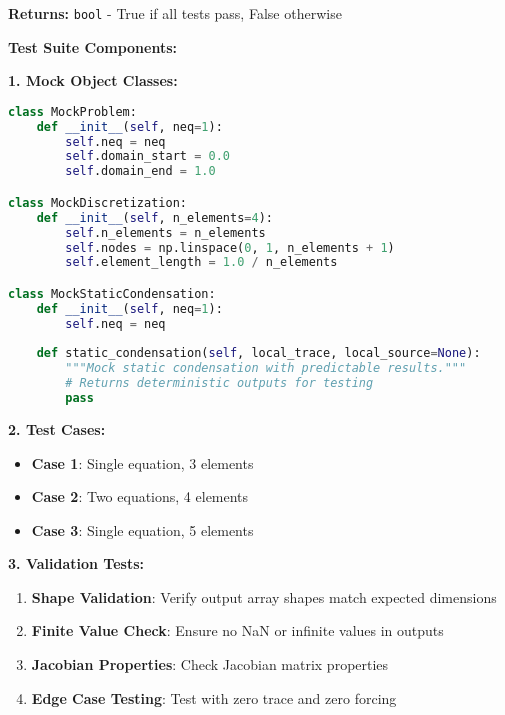 \textbf{Returns:} \texttt{bool} - True if all tests pass, False otherwise

\textbf{Test Suite Components:}

\textbf{1. Mock Object Classes:}
\begin{lstlisting}[language=Python, caption=Mock Object Definitions]
class MockProblem:
    def __init__(self, neq=1):
        self.neq = neq
        self.domain_start = 0.0
        self.domain_end = 1.0

class MockDiscretization:
    def __init__(self, n_elements=4):
        self.n_elements = n_elements
        self.nodes = np.linspace(0, 1, n_elements + 1)
        self.element_length = 1.0 / n_elements

class MockStaticCondensation:
    def __init__(self, neq=1):
        self.neq = neq
        
    def static_condensation(self, local_trace, local_source=None):
        """Mock static condensation with predictable results."""
        # Returns deterministic outputs for testing
        pass
\end{lstlisting}

\textbf{2. Test Cases:}
\begin{itemize}
    \item \textbf{Case 1}: Single equation, 3 elements
    \item \textbf{Case 2}: Two equations, 4 elements  
    \item \textbf{Case 3}: Single equation, 5 elements
\end{itemize}

\textbf{3. Validation Tests:}
\begin{enumerate}
    \item \textbf{Shape Validation}: Verify output array shapes match expected dimensions
    \item \textbf{Finite Value Check}: Ensure no NaN or infinite values in outputs
    \item \textbf{Jacobian Properties}: Check Jacobian matrix properties
    \item \textbf{Edge Case Testing}: Test with zero trace and zero forcing
\end{enumerate}


